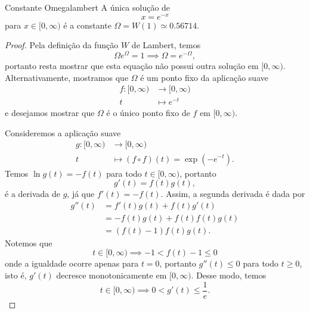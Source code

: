 \begin{proposition}{Constante Omega}{lambert}
    A única solução de
    \begin{equation*}
        x = e^{-x}
    \end{equation*}
    para \(x \in [0,\infty)\) é a constante \(\Omega = W(1) \simeq 0.56714.\)
\end{proposition}
\begin{proof}
    Pela definição da função \(W\) de Lambert, temos
    \begin{equation*}
        \Omega e^\Omega = 1 \implies \Omega = e^{-\Omega},
    \end{equation*}
    portanto resta mostrar que esta equação não possui outra solução em \([0,\infty)\). Alternativamente, mostramos que \(\Omega\) é um ponto fixo da aplicação suave
    \begin{align*}
        f : [0, \infty) &\to [0, \infty)\\
                      t &\mapsto e^{-t}
    \end{align*}
    e desejamos mostrar que \(\Omega\) é o único ponto fixo de \(f\) em \([0,\infty)\).

    Consideremos a aplicação suave
    \begin{align*}
        g : [0, \infty) &\to [0,\infty)\\
                      t &\mapsto (f\circ f)(t) = \exp{\left(-e^{-t}\right)}.
    \end{align*}
    Temos \(\ln{g(t)} = -f(t)\) para todo \(t \in [0,\infty)\), portanto
    \begin{equation*}
        g'(t) = f(t) g(t),
    \end{equation*}
    é a derivada de \(g\), já que \(f'(t) = -f(t)\). Assim, a segunda derivada é dada por
    \begin{align*}
        g''(t) &= f'(t)g(t) + f(t)g'(t)\\
               &= -f(t) g(t) + f(t) f(t) g(t)\\
               &= \left(f(t) - 1\right) f(t) g(t).
    \end{align*}
    Notemos que
    \begin{equation*}
        t \in [0, \infty) \implies -1 < f(t) - 1 \leq 0
    \end{equation*}
    onde a igualdade ocorre apenas para \(t = 0\), portanto \(g''(t) \leq 0\) para todo \(t \geq 0\), isto é, \(g'(t)\) decresce monotonicamente em \([0, \infty)\). Desse modo, temos
    \begin{equation*}
        t \in [0, \infty) \implies 0 < g'(t) \leq \frac1e.
    \end{equation*}


\end{proof}
